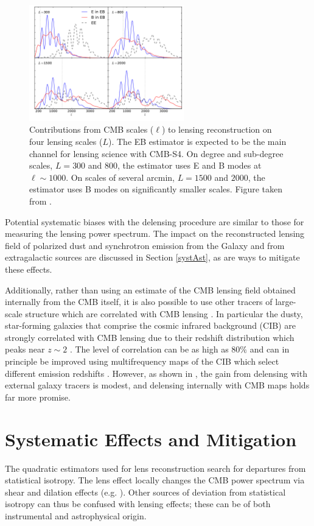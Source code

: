 \begin{figure}[htbp]
\centering
\includegraphics[width=0.60\textwidth]{CMBLensing/signal_contribs.pdf}
\caption{Contributions from CMB scales ($\ell$) to lensing reconstruction on four lensing scales ($L$).  The EB estimator is expected to be the main channel for lensing science with CMB-S4.  On degree and sub-degree scales, $L = 300$ and $800$, the estimator uses E and B modes at $\ell \sim 1000$.  On scales of several arcmin, $L = 1500$ and $2000$, the estimator uses B modes on significantly smaller scales.  Figure taken from \cite{Pearson:2013iha}.}
\label{sigCon}
\end{figure}

Potential systematic biases with the delensing procedure are similar to those for measuring the lensing power spectrum. The impact on the reconstructed lensing field of polarized dust and synchrotron emission from the Galaxy and from extragalactic sources are discussed in Section \ref{systAst}, as are ways to mitigate these effects.

Additionally, rather than using an estimate of the CMB lensing field obtained internally from the CMB itself, it is also possible to use other tracers of large-scale structure which are correlated with  CMB lensing \cite{Smith:2010gu}.  In particular the dusty, star-forming galaxies that comprise the cosmic infrared background (CIB) are strongly correlated with CMB lensing due to their redshift distribution which peaks near $z \sim 2$ \cite{Sherwin:2015baa, Simard:2014aqa}.  The level of correlation can be as high as $80\%$ \cite{Ade:2013aro} and can in principle be improved using multifrequency maps of the CIB which select different emission redshifts \cite{Sherwin:2015baa}. However, as shown in \cite{Smith:2010gu}, the gain from delensing with external galaxy tracers is modest, and delensing internally with CMB maps holds far more promise.


\section{Systematic Effects and Mitigation}\label{syst}
The quadratic estimators used for lens reconstruction search for departures from statistical isotropy.  The lens effect locally changes the CMB power spectrum via shear and dilation effects (e.g. \cite{Bucher:2010iv}).  Other sources of deviation from statistical isotropy can thus be confused with lensing effects; these can be of both instrumental and astrophysical origin.

